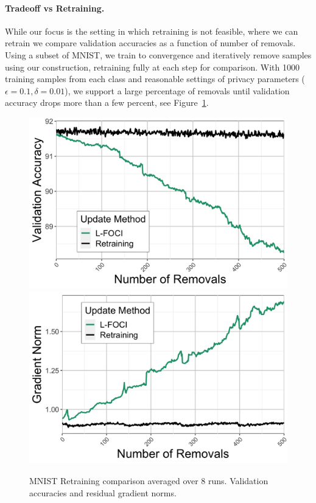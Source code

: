 \paragraph{Tradeoff vs Retraining.}
While our focus is the setting in which retraining is not feasible, where we can retrain we compare validation accuracies as a function of number of removals. Using a subset of MNIST, we train to convergence and iteratively remove samples using our construction, retraining fully at each step for comparison. With 1000 training samples from each class 
and reasonable settings of privacy parameters ($\epsilon=0.1,\delta=0.01$),
we support a large percentage of removals until validation accuracy drops more than a few percent, see Figure~\ref{fig:retrain}.
\begin{figure}
    \centering
\includegraphics[width=0.49\columnwidth]{5_unlearn/figs/retrain/Retrain_Validation_Accs.png}
\includegraphics[width=0.49\columnwidth]{5_unlearn/figs/retrain/Retrain_Gradient_Norms.png}
    \caption[MNIST retraining comparison]{MNIST Retraining comparison averaged over 8 runs. Validation accuracies and residual gradient norms.}
    \label{fig:retrain}
\end{figure}

